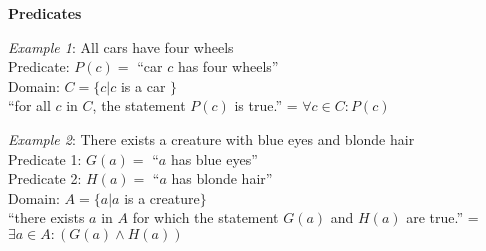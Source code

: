 \documentclass[12pt, letterpaper]{article}
\begin{document}
\begin{multicols}{2}

\textbf{Predicates}

\textit{Example 1}: All cars have four wheels \\
\null \quad Predicate: $P(c) =$ ``car $c$ has four wheels'' \\
\null \quad Domain: $C = \{ c | c$ is a car $\}$ \\
\null \quad ``for all $c$ in $C$, the statement $P(c)$ is true.'' = $\forall c \in C : P(c)$

\textit{Example 2}: There exists a creature with blue eyes and blonde hair \\
\null \quad Predicate 1: $G(a) =$ ``$a$ has blue eyes'' \\
\null \quad Predicate 2: $H(a) =$ ``$a$ has blonde hair'' \\
\null \quad Domain: $A = \{ a | a$ is a creature$\}$ \\
\null \quad ``there exists $a$ in $A$ for which the statement $G(a)$ and $H(a)$ are true.'' = $\exists a \in A : (G(a) \land H(a))$


\end{multicols}
\end{document}
